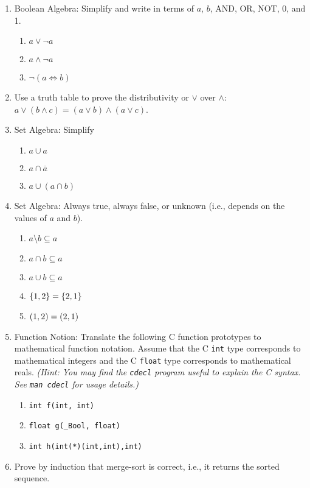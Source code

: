 \documentclass[12pt,letterpaper]{ntdhw}
\begin{document}
\begin{enumerate}
  \item Boolean Algebra: Simplify and write in terms of $a$, $b$, AND,
  OR, NOT, 0, and 1.
  \begin{enumerate}
    \item $a \lor \lnot a$
    \item $a \land \lnot a$
    \item $\lnot (a \iff b)$
  \end{enumerate}


  \item Use a truth table to prove the distributivity or $\lor$ over
  $\land$:\\
  $a \lor (b \land c) = (a \lor b) \land (a \lor c)$.

  \item Set Algebra: Simplify
  \begin{enumerate}
    \item $a \cup a$
    \item $a \cap \overline{a}$
    \item $a \cup (a \cap b)$
  \end{enumerate}

  \item Set Algebra: Always true, always false, or unknown (i.e., depends on the
  values of $a$ and $b$).
  \begin{enumerate}
    \item $a \setminus b \subseteq a$
    \item $a \cap b \subseteq a$
    \item $a \cup b \subseteq a$
    \item $ \left\{1,2\right\}  =  \left\{2,1\right\} $
    \item $ \left(1,2\right)  =  \left(2,1\right) $
  \end{enumerate}

  \item Function Notion: Translate the following C function prototypes
  to mathematical function notation.  Assume that the C {\tt int} type
  corresponds to mathematical integers and the C {\tt float} type
  corresponds to mathematical reals.  \emph{(Hint: You may find the
    {\tt cdecl} program useful to explain the C syntax.  See {\tt man
      cdecl} for usage details.)}
  \begin{enumerate}
    \item {\tt int f(int, int)}
    \item {\tt float g(\_Bool, float)}

    \item {\tt int h(int(*)(int,int),int)}
  \end{enumerate}

  \item Prove by induction that merge-sort is correct, i.e., it
  returns the sorted sequence.

\end{enumerate}
\end{document}
